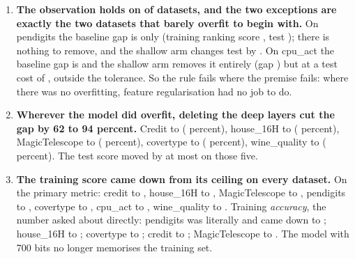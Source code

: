 \documentclass[11pt,a4paper]{article}
\newcommand{\num}[1]{\texttt{#1}}
\begin{document}
\begin{enumerate}

\item \textbf{The observation holds on \nHolds{} of \nDatasets{} datasets, and
the two exceptions are exactly the two datasets that barely overfit to begin
with.} On pendigits the baseline gap is only \num{\pendigitsBaseGap} (training
ranking score \num{\pendigitsBaseTrain}, test \num{\pendigitsBaseTest}); there
is nothing to remove, and the shallow arm changes test by
\num{\pendigitsDTest}. On cpu\_act the baseline gap is \num{\cpuactBaseGap}
and the shallow arm removes it entirely (gap \num{\cpuactKeepGap}) but at a
test cost of \num{\cpuactDTest}, outside the tolerance. So the rule fails where
the premise fails: where there was no overfitting, feature regularisation had
no job to do.

\item \textbf{Wherever the model did overfit, deleting the deep layers cut the
gap by 62 to 94 percent.} Credit \num{\creditBaseGap} to \num{\creditKeepGap}
(\creditGapCut{} percent), house\_16H \num{\houseSixteenHBaseGap} to
\num{\houseSixteenHKeepGap} (\houseSixteenHGapCut{} percent), MagicTelescope
\num{\MagicTelescopeBaseGap} to \num{\MagicTelescopeKeepGap}
(\MagicTelescopeGapCut{} percent), covertype \num{\covertypeBaseGap} to
\num{\covertypeKeepGap} (\covertypeGapCut{} percent), wine\_quality
\num{\winequalityBaseGap} to \num{\winequalityKeepGap} (\winequalityGapCut{}
percent). The test score moved by at most \num{\covertypeDTest} on those five.

\item \textbf{The training score came down from its ceiling on every dataset.}
On the primary metric: credit \num{\creditBaseTrain} to
\num{\creditKeepTrain}, house\_16H \num{\houseSixteenHBaseTrain} to
\num{\houseSixteenHKeepTrain}, MagicTelescope \num{\MagicTelescopeBaseTrain}
to \num{\MagicTelescopeKeepTrain}, pendigits \num{\pendigitsBaseTrain} to
\num{\pendigitsKeepTrain}, covertype \num{\covertypeBaseTrain} to
\num{\covertypeKeepTrain}, cpu\_act \num{\cpuactBaseTrain} to
\num{\cpuactKeepTrain}, wine\_quality \num{\winequalityBaseTrain} to
\num{\winequalityKeepTrain}. Training \emph{accuracy}, the number asked about
directly: pendigits was literally \num{\pendigitsBaseTrainAcc} and came down
to \num{\pendigitsKeepTrainAcc}; house\_16H \num{\houseSixteenHBaseTrainAcc}
to \num{\houseSixteenHKeepTrainAcc}; covertype \num{\covertypeBaseTrainAcc}
to \num{\covertypeKeepTrainAcc}; credit \num{\creditBaseTrainAcc} to
\num{\creditKeepTrainAcc}; MagicTelescope \num{\MagicTelescopeBaseTrainAcc}
to \num{\MagicTelescopeKeepTrainAcc}. The model with 700 bits no longer
memorises the training set.


\end{enumerate}
\end{document}
